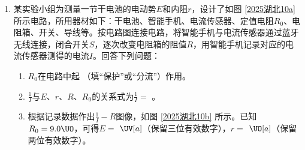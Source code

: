 \documentclass[\gkver]{gaokaozhenti}
\begin{document}
\begin{enumerate}


{方向与$ x $轴负方向成$ 18 \degree $夹角斜向下}
{大小为$\frac{2kq}{R^2} ( \cos 54 \degree + \cos 18 \degree ) $}
{大小为$\frac{2kq}{R^{2}} (2 \cos 54 \degree + \cos 18 \degree ) $}


\item
某实验小组为测量一节干电池的电动势$ E $和内阻$ r $，设计了如图 \ref{2025湖北10a} 所示电路，所用器材如下：干电池、智能手机、电流传感器、定值电阻$ R_{0} $、电阻箱、开关、导线等。按电路图连接电路，将智能手机与电流传感器通过蓝牙无线连接，闭合开关$ S $，逐次改变电阻箱的阻值$ R $，用智能手机记录对应的电流传感器测得的电流$ I $。回答下列问题：

\begin{enumerate}
\item
$ R_{0} $在电路中起  （填“保护”或“分流”）作用。

\item 
$\frac{1}{I}$与$ E $、$ r $、$ R $、$ R_{0} $的关系式为$ \frac{1}{I}= $  。

\item 
根据记录数据作出$\frac{1}{I} - R $图像，如图 \ref{2025湖北10b} 所示。已知$ R_{0} =9.0 \UO $，可得$ E=$  $ \UV[a] $（保留三位有效数字），$ r= $  $\UO[a] $（保留两位有效数字）。



\end{enumerate}
\end{enumerate}
\end{document}
